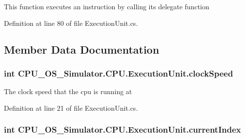 This function executes an instruction by calling its delegate function 



Definition at line 80 of file Execution\+Unit.\+cs.



\subsection{Member Data Documentation}
\hypertarget{class_c_p_u___o_s___simulator_1_1_c_p_u_1_1_execution_unit_a0deb0a3e0c9fa402598bbf18be6535cc}{}
\subsubsection[{clock\+Speed}]{\setlength{\rightskip}{0pt plus 5cm}int C\+P\+U\+\_\+\+O\+S\+\_\+\+Simulator.\+C\+P\+U.\+Execution\+Unit.\+clock\+Speed\hspace{0.3cm}{\ttfamily [private]}}\label{class_c_p_u___o_s___simulator_1_1_c_p_u_1_1_execution_unit_a0deb0a3e0c9fa402598bbf18be6535cc}


The clock speed that the cpu is running at 



Definition at line 21 of file Execution\+Unit.\+cs.

\hypertarget{class_c_p_u___o_s___simulator_1_1_c_p_u_1_1_execution_unit_af6807cb5343acc2c40a08166c748f1f0}{}
\subsubsection[{current\+Index}]{\setlength{\rightskip}{0pt plus 5cm}int C\+P\+U\+\_\+\+O\+S\+\_\+\+Simulator.\+C\+P\+U.\+Execution\+Unit.\+current\+Index\hspace{0.3cm}{\ttfamily [private]}}\label{class_c_p_u___o_s___simulator_1_1_c_p_u_1_1_execution_unit_af6807cb5343acc2c40a08166c748f1f0}


